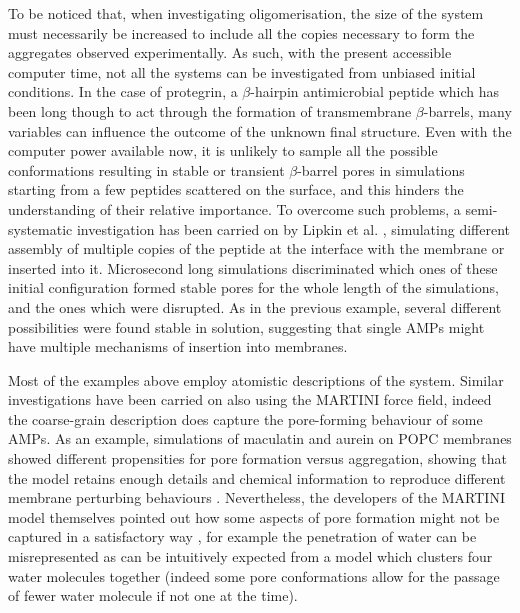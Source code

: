 To be noticed that, when investigating oligomerisation, the size of the system must necessarily be increased to include all the copies necessary to form the aggregates observed experimentally. As such, with the present accessible computer time, not all the systems can be investigated from unbiased initial conditions.
%
In the case of protegrin, a $\beta$-hairpin antimicrobial peptide which has been long though to act through the formation of transmembrane $\beta$-barrels, many variables can influence the outcome of the unknown final structure.
%
Even with the computer power available now, it is unlikely to sample all the possible conformations resulting in stable or transient $\beta$-barrel pores in simulations starting from a few peptides scattered on the surface, and this hinders the understanding of their relative importance.
%
To overcome such problems, a semi-systematic investigation has been carried on by Lipkin et al. \cite{Lipkin2017}, simulating different assembly of multiple copies of the peptide at the interface with the membrane or inserted into it.
%
Microsecond long simulations discriminated which ones of these initial configuration formed stable pores for the whole length of the simulations, and the ones which were disrupted. As in the previous example, several different possibilities were found stable in solution, suggesting that single AMPs might have multiple mechanisms of insertion into membranes.

Most of the examples above employ atomistic descriptions of the system. Similar investigations have been carried on also using the MARTINI force field, indeed the coarse-grain description does capture the pore-forming behaviour of some AMPs.
%
As an example, simulations of maculatin and aurein on POPC membranes showed different propensities for pore formation versus aggregation, showing that the model retains enough details and chemical information to reproduce different membrane perturbing behaviours \cite{Balatti2017}.
%
Nevertheless, the developers of the MARTINI model themselves pointed out how some aspects of pore formation might not be captured in a satisfactory way \cite{Marrink2013}, for example the penetration of water can be misrepresented as can be intuitively expected from a model which clusters four water molecules together (indeed some pore conformations allow for the passage of fewer water molecule if not one at the time).

